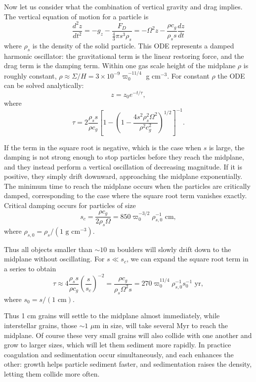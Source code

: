 Now let us consider what the combination of vertical gravity and drag implies. The vertical equation of motion for a particle is
\begin{equation}
\frac{d^2 z}{dt^2} = -g_z - \frac{F_D}{\frac{4}{3}\pi s^3 \rho_s} = -\Omega^2 z - \frac{\rho c_g}{\rho_s s} \frac{dz}{dt}
\end{equation}
where $\rho_s$ is the density of the solid particle. This ODE represents a damped harmonic oscillator: the gravitational term is the linear restoring force, and the drag term is the damping term. Within one gas scale height of the midplane $\rho$ is roughly constant, $\rho \approx \Sigma/H = 3\times 10^{-9} \varpi_0^{-11/4}$ g cm$^{-3}$. For constant $\rho$ the ODE can be solved analytically:
\begin{equation}
z = z_0 e^{-t/\tau},
\end{equation}
where
\begin{equation}
\tau = 2\frac{\rho_s s}{\rho c_g} \left[1 - \left(1 - \frac{4 s^2 \rho_s^2 \Omega^2}{\rho^2 c_g^2}\right)^{1/2}\right]^{-1}.
\end{equation}

If the term in the square root is negative, which is the case when $s$ is large, the damping is not strong enough to stop particles before they reach the midplane, and they instead perform a vertical oscillation of decreasing magnitude. If it is positive, they simply drift downward, approaching the midplane exponentially. The minimum time to reach the midplane occurs when the particles are critically damped, corresponding to the case where the square root term vanishes exactly. Critical damping occurs for particles of size
\begin{equation}
s_c = \frac{\rho c_g}{2 \rho_s \Omega} = 850 \varpi_0^{-3/2} \rho_{s,0}^{-1}\mbox{ cm},
\end{equation}
where $\rho_{s,0} = \rho_s/(1\mbox{ g cm}^{-3})$.

Thus all objects smaller than $\sim 10$ m boulders will slowly drift down to the midplane without oscillating. For $s\ll s_c$, we can expand the square root term in a series to obtain
\begin{equation}
\tau \approx 4 \frac{\rho_s s}{\rho c_g} \left(\frac{s}{s_c}\right)^{-2} = \frac{\rho c_g}{\rho_s \Omega^2 s} = 270 \varpi_0^{11/4} \rho_{s,0}^{-1} s_0^{-1}\mbox{ yr},
\end{equation}
where $s_0 = s/(1\mbox{ cm})$. 

Thus 1 cm grains will settle to the midplane almost immediately, while interstellar grains, those $\sim 1$ $\mu$m in size, will take several Myr to reach the midplane. Of course these very small grains will also collide with one another and grow to larger sizes, which will let them sediment more rapidly. In practice coagulation and sedimentation occur simultaneously, and each enhances the other: growth helps particle sediment faster, and sedimentation raises the density, letting them collide more often.

